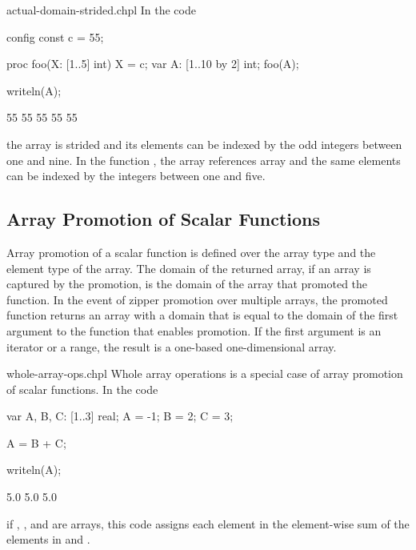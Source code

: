 \begin{chapelexample}{actual-domain-strided.chpl}
In the code
\begin{chapelpre}
config const c = 55;
\end{chapelpre}
\begin{chapel}
proc foo(X: [1..5] int) { X = c; }
var A: [1..10 by 2] int;
foo(A);
\end{chapel}
\begin{chapelpost}
writeln(A);
\end{chapelpost}
\begin{chapeloutput}
55 55 55 55 55
\end{chapeloutput}
the array  is strided and its elements can be indexed by the
odd integers between one and nine.  In the function , the
array  references array  and the same elements can be
indexed by the integers between one and five.
\end{chapelexample}


\subsection{Array Promotion of Scalar Functions}
\label{Array_Promotion_of_Scalar_Functions}

Array promotion of a scalar function is defined over the array type
and the element type of the array.  The domain of the returned array,
if an array is captured by the promotion, is the domain of the array
that promoted the function.  In the event of zipper promotion over
multiple arrays, the promoted function returns an array with a domain
that is equal to the domain of the first argument to the function that
enables promotion.  If the first argument is an iterator or a range,
the result is a one-based one-dimensional array.

\begin{chapelexample}{whole-array-ops.chpl}
Whole array operations is a special case of array promotion of scalar
functions.  In the code
\begin{chapelpre}
var A, B, C: [1..3] real;
A = -1;
B = 2;
C = 3;
\end{chapelpre}
\begin{chapel}
A = B + C;
\end{chapel}
\begin{chapelpost}
writeln(A);
\end{chapelpost}
\begin{chapeloutput}
5.0 5.0 5.0
\end{chapeloutput}
if , , and  are arrays, this code assigns each
element in  the element-wise sum of the elements in 
and .
\end{chapelexample}

